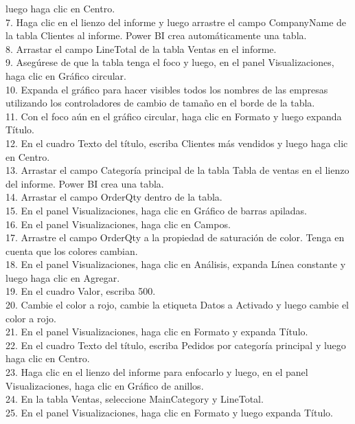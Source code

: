 \begin{flushleft}
\begin{itemize}
luego haga clic en Centro.\\
7. Haga clic en el lienzo del informe y luego arrastre el campo CompanyName de la tabla Clientes al informe.
Power BI crea automáticamente una tabla.\\
8. Arrastar el campo LineTotal de la tabla Ventas en el informe.\\
9. Asegúrese de que la tabla tenga el foco y luego, en el panel Visualizaciones, haga clic en Gráfico circular.\\
10. Expanda el gráfico para hacer visibles todos los nombres de las empresas utilizando los controladores de cambio de tamaño en el borde
de la tabla.\\
11. Con el foco aún en el gráfico circular, haga clic en Formato y luego expanda Título.\\
12. En el cuadro Texto del título, escriba Clientes más vendidos y luego haga clic en Centro.\\
13. Arrastar el campo Categoría principal de la tabla Tabla de ventas en el lienzo del informe. Power BI crea una tabla.\\
14. Arrastar el campo OrderQty dentro de la tabla.\\
15. En el panel Visualizaciones, haga clic en Gráfico de barras apiladas.\\
16. En el panel Visualizaciones, haga clic en Campos.\\
17. Arrastre el campo OrderQty a la propiedad de saturación de color. Tenga en cuenta que los colores cambian.\\
18. En el panel Visualizaciones, haga clic en Análisis, expanda Línea constante y luego haga clic en Agregar.\\
19. En el cuadro Valor, escriba 500.\\
20. Cambie el color a rojo, cambie la etiqueta Datos a Activado y luego cambie el color a rojo.\\
21. En el panel Visualizaciones, haga clic en Formato y expanda Título.\\
22. En el cuadro Texto del título, escriba Pedidos por categoría principal y luego haga clic en Centro.\\
23. Haga clic en el lienzo del informe para enfocarlo y luego, en el panel Visualizaciones, haga clic en Gráfico de anillos.\\
24. En la tabla Ventas, seleccione MainCategory y LineTotal.\\
25. En el panel Visualizaciones, haga clic en Formato y luego expanda Título.\\

\end{itemize}
\end{flushleft}
